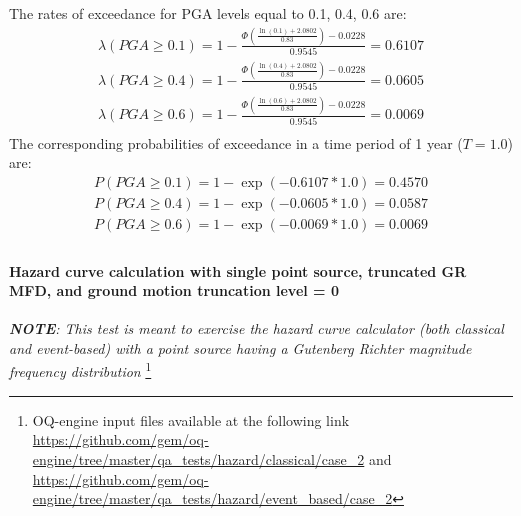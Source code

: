 The rates of exceedance for PGA levels equal to 0.1, 0.4, 0.6 are:
\begin{eqnarray}
\lambda(PGA \geq 0.1) = 1 - \frac{\Phi(\frac{\ln(0.1) + 2.0802} {0.83}) -0.0228}
					{0.9545} = 0.6107 \nonumber \\
\lambda(PGA \geq 0.4) = 1 - \frac{\Phi(\frac{\ln(0.4) + 2.0802} {0.83}) -0.0228}
					{0.9545} = 0.0605 \nonumber \\
\lambda(PGA \geq 0.6) = 1 - \frac{\Phi(\frac{\ln(0.6) + 2.0802} {0.83}) -0.0228}
					{0.9545} = 0.0069 \nonumber \\
\end{eqnarray}
The corresponding probabilities of exceedance in a time period of 1 year ($T=1.0$) are:
\begin{eqnarray}
P(PGA \geq 0.1) = 1 - \exp(- 0.6107 * 1.0) = 0.4570 \nonumber \\
P(PGA \geq 0.4) = 1 - \exp(- 0.0605 * 1.0) = 0.0587 \nonumber \\
P(PGA \geq 0.6) = 1 - \exp(- 0.0069 * 1.0) = 0.0069 \nonumber \\
\end{eqnarray}
%
\clearpage
%
\paragraph{Hazard curve calculation with single point source, 
truncated GR MFD, and ground motion truncation level = 0}
\textit{\textbf{NOTE}: This test is meant to exercise the hazard curve
    calculator (both classical and event-based) with a point source
    having a Gutenberg Richter magnitude frequency distribution} \footnote{
    OQ-engine input files available at the following link
    \url{https://github.com/gem/oq-engine/tree/master/qa_tests/hazard/classical/case_2}
    and 
    \url{https://github.com/gem/oq-engine/tree/master/qa_tests/hazard/event_based/case_2}
}


